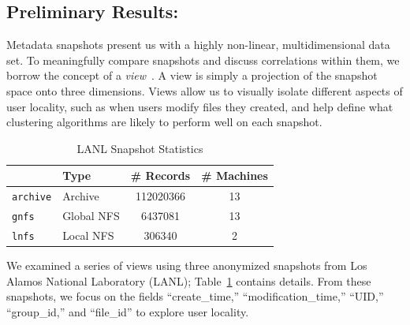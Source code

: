 \subsection{Preliminary Results: }
Metadata snapshots present us with a highly non-linear, multidimensional
data set.  To meaningfully compare snapshots and discuss correlations within
them, we borrow the concept of a \textit{view}~\cite{mascotssnapshot}.  A view is simply a
projection of the snapshot space onto three dimensions.  Views allow us to
visually isolate different aspects of user locality, such as when users modify
files they created, and help define what clustering
algorithms are likely to perform well on each snapshot.

\begin{table}%
\centering
\small
\caption{LANL Snapshot Statistics}
\begin{tabular}{llcc}
\toprule
&Type&\# Records&\# Machines\\
\midrule
\texttt{archive}&Archive&112020366&13\\ 
\texttt{gnfs}&Global NFS&6437081&13\\
\texttt{lnfs}&Local NFS&306340&2\\
\bottomrule
\end{tabular}
\label{tab:datasets}
\end{table}
\normalsize

We examined a series of views using three anonymized snapshots from Los Alamos
National Laboratory (LANL); Table~\ref{tab:datasets} contains details.    
From these snapshots, we focus on the fields ``create\_time,'' ``modification\_time,''
``UID,'' ``group\_id,'' and ``file\_id'' to explore user locality.

